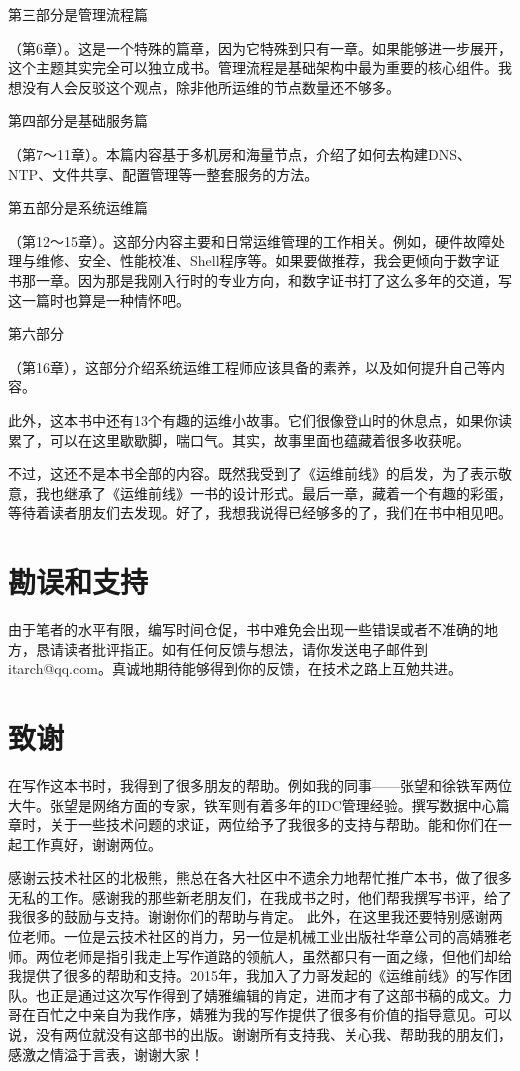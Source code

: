 \documentclass[12pt,UTF8]{ctexbook}
\begin{document}
第三部分是管理流程篇

（第6章）。这是一个特殊的篇章，因为它特殊到只有一章。如果能够进一步展开，这个主题其实完全可以独立成书。管理流程是基础架构中最为重要的核心组件。我想没有人会反驳这个观点，除非他所运维的节点数量还不够多。

第四部分是基础服务篇

（第7～11章）。本篇内容基于多机房和海量节点，介绍了如何去构建DNS、NTP、文件共享、配置管理等一整套服务的方法。

第五部分是系统运维篇

（第12～15章）。这部分内容主要和日常运维管理的工作相关。例如，硬件故障处理与维修、安全、性能校准、Shell程序等。如果要做推荐，我会更倾向于数字证书那一章。因为那是我刚入行时的专业方向，和数字证书打了这么多年的交道，写这一篇时也算是一种情怀吧。

第六部分

（第16章），这部分介绍系统运维工程师应该具备的素养，以及如何提升自己等内容。

此外，这本书中还有13个有趣的运维小故事。它们很像登山时的休息点，如果你读累了，可以在这里歇歇脚，喘口气。其实，故事里面也蕴藏着很多收获呢。

不过，这还不是本书全部的内容。既然我受到了《运维前线》的启发，为了表示敬意，我也继承了《运维前线》一书的设计形式。最后一章，藏着一个有趣的彩蛋，等待着读者朋友们去发现。好了，我想我说得已经够多的了，我们在书中相见吧。

\section{勘误和支持}

由于笔者的水平有限，编写时间仓促，书中难免会出现一些错误或者不准确的地方，恳请读者批评指正。如有任何反馈与想法，请你发送电子邮件到itarch@qq.com。真诚地期待能够得到你的反馈，在技术之路上互勉共进。

\section{致谢}

在写作这本书时，我得到了很多朋友的帮助。例如我的同事——张望和徐铁军两位大牛。张望是网络方面的专家，铁军则有着多年的IDC管理经验。撰写数据中心篇章时，关于一些技术问题的求证，两位给予了我很多的支持与帮助。能和你们在一起工作真好，谢谢两位。

感谢云技术社区的北极熊，熊总在各大社区中不遗余力地帮忙推广本书，做了很多无私的工作。感谢我的那些新老朋友们，在我成书之时，他们帮我撰写书评，给了我很多的鼓励与支持。谢谢你们的帮助与肯定。
此外，在这里我还要特别感谢两位老师。一位是云技术社区的肖力，另一位是机械工业出版社华章公司的高婧雅老师。两位老师是指引我走上写作道路的领航人，虽然都只有一面之缘，但他们却给我提供了很多的帮助和支持。2015年，我加入了力哥发起的《运维前线》的写作团队。也正是通过这次写作得到了婧雅编辑的肯定，进而才有了这部书稿的成文。力哥在百忙之中亲自为我作序，婧雅为我的写作提供了很多有价值的指导意见。可以说，没有两位就没有这部书的出版。谢谢所有支持我、关心我、帮助我的朋友们，感激之情溢于言表，谢谢大家！
\end{document}
